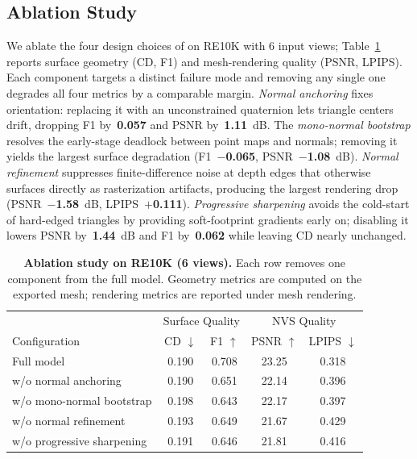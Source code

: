 \subsection{Ablation Study}
\label{sec:ablation}

We ablate the four design choices of \method on RE10K with 6 input views; Table~\ref{tab:ablation} reports surface geometry (CD, F1) and mesh-rendering quality (PSNR, LPIPS). Each component targets a distinct failure mode and removing any single one degrades all four metrics by a comparable margin. \emph{Normal anchoring} fixes orientation: replacing it with an unconstrained quaternion lets triangle centers drift, dropping F1 by~\textbf{0.057} and PSNR by~\textbf{1.11}~dB. The \emph{mono-normal bootstrap} resolves the early-stage deadlock between point maps and normals; removing it yields the largest surface degradation (F1~$-$\textbf{0.065}, PSNR~$-$\textbf{1.08}~dB). \emph{Normal refinement} suppresses finite-difference noise at depth edges that otherwise surfaces directly as rasterization artifacts, producing the largest rendering drop (PSNR~$-$\textbf{1.58}~dB, LPIPS~$+$\textbf{0.111}). \emph{Progressive sharpening} avoids the cold-start of hard-edged triangles by providing soft-footprint gradients early on; disabling it lowers PSNR by~\textbf{1.44}~dB and F1 by~\textbf{0.062} while leaving CD nearly unchanged.







\begin{table}[t]
\centering
\caption{\textbf{Ablation study on RE10K (6 views).} Each row removes one component from the full model. Geometry metrics are computed on the exported mesh; rendering metrics are reported under mesh rendering.}
\label{tab:ablation}
{\footnotesize
\setlength{\tabcolsep}{5.2pt}
\renewcommand{\arraystretch}{0.94}
\begin{tabular}{l|cc|cc}
\toprule
& \multicolumn{2}{c|}{Surface Quality} & \multicolumn{2}{c}{NVS Quality} \\
Configuration & CD $\downarrow$ & F1 $\uparrow$ & PSNR $\uparrow$ & LPIPS $\downarrow$ \\
\midrule
Full model                          & 0.190 & 0.708 & 23.25 & 0.318 \\
\midrule
w/o normal anchoring                & 0.190 & 0.651 & 22.14 & 0.396 \\
w/o mono-normal bootstrap           & 0.198 & 0.643 & 22.17 & 0.397 \\
w/o normal refinement               & 0.193 & 0.649 & 21.67 & 0.429 \\
w/o progressive sharpening          & 0.191 & 0.646 & 21.81 & 0.416 \\
\bottomrule
\end{tabular}
}
\end{table}
